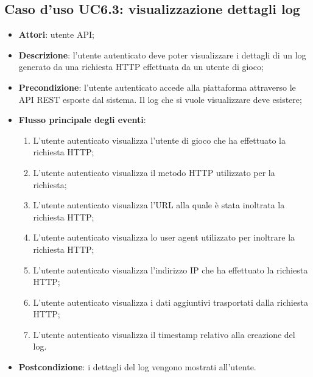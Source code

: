 \subsection{Caso d'uso UC6.3: visualizzazione dettagli log}
\begin{itemize}
\item \textbf{Attori}: utente API;
\item \textbf{Descrizione}: l'utente autenticato deve poter visualizzare i dettagli di un log generato da una richiesta HTTP effettuata da un utente di gioco; 
      \item \textbf{Precondizione}: l'utente autenticato accede alla piattaforma attraverso le API REST esposte dal sistema. Il log che si vuole visualizzare deve esistere;

        \item \textbf{Flusso principale degli eventi}:
          \begin{enumerate}
          \item L'utente autenticato visualizza l'utente di gioco che ha effettuato la richiesta HTTP;
          \item L'utente autenticato visualizza il metodo HTTP utilizzato per la richiesta;
          \item L'utente autenticato visualizza l'URL alla quale è stata inoltrata la richiesta HTTP;
          \item L'utente autenticato visualizza lo user agent utilizzato per inoltrare la richiesta HTTP;
          \item L'utente autenticato visualizza l'indirizzo IP che ha effettuato la richiesta HTTP;
          \item L'utente autenticato visualizza i dati aggiuntivi trasportati dalla richiesta HTTP;
          \item L'utente autenticato visualizza il timestamp relativo alla creazione del log.

      \end{enumerate}
    \item \textbf{Postcondizione}: i dettagli del log vengono mostrati all'utente.
  \end{itemize}
\hypertarget{UC6.4}{}
